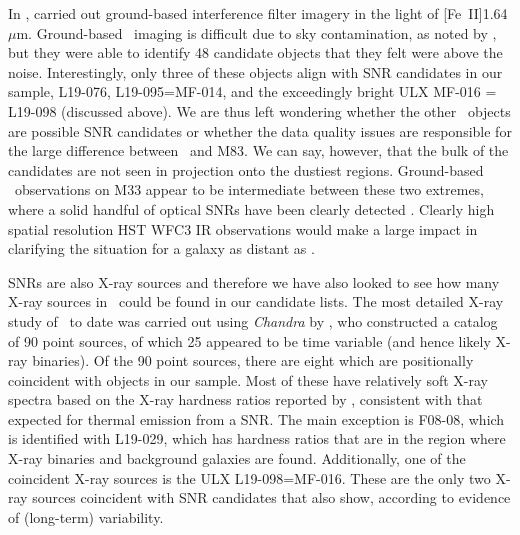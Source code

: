 In \gal, \citet{bruursema14}  carried out ground-based interference filter imagery in the light of [Fe~II]1.64 $\mu$m. Ground-based \feii\ imaging is difficult due to sky contamination, as noted by  \citet{bruursema14}, but they were able to identify 48 candidate objects that they felt were above the noise.  Interestingly, only three of these objects align with SNR candidates in our sample, L19-076, L19-095=MF-014, and the exceedingly bright ULX MF-016 = L19-098 (discussed above). We are thus left wondering whether the other \feii\ objects are possible SNR candidates or whether the data quality issues are responsible for the large difference between \gal\ and M83. We can say, however, that the bulk of the \citet{bruursema14} candidates are not seen in projection onto the dustiest regions. Ground-based \feii\ observations on M33 appear to be intermediate between these two extremes, where a solid handful of optical SNRs have been clearly detected \citep{morel02}.  Clearly high spatial resolution HST WFC3 IR observations would make a large impact in clarifying the situation for a galaxy as distant as \gal.


SNRs are also X-ray sources and therefore we have also looked to see how many X-ray sources in \gal\ could be found in our candidate lists.  The most detailed X-ray study of \gal\ to date was carried out using {\em Chandra} by \cite{fridriksson08}, who constructed a catalog of 90 point sources, of which 25 appeared to be time variable (and hence likely X-ray binaries).  Of the 90 point sources, there are eight which are positionally coincident with objects in our sample.  Most of these have relatively soft X-ray spectra based on the X-ray hardness ratios reported by \cite{fridriksson08}, consistent with that expected for thermal emission from a SNR.  The main exception is F08-08, which is identified with L19-029, which has hardness ratios that are in the region where X-ray binaries and background galaxies are found.  Additionally, one of the coincident X-ray sources is the ULX L19-098=MF-016.  These are the only two X-ray sources coincident with SNR candidates that also show, according to \cite{fridriksson08} evidence of (long-term) variability. 

